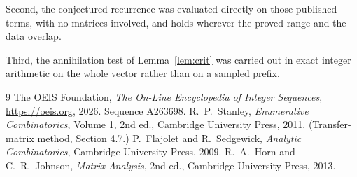 \documentclass[11pt,a4paper]{article}
\theoremstyle{plain}
\theoremstyle{definition}
\begin{document}
Second, the conjectured recurrence was evaluated directly on those published terms, with no
matrices involved, and holds wherever the proved range and the data overlap.

Third, the annihilation test of Lemma~\ref{lem:crit} was carried out in exact integer
arithmetic on the whole vector rather than on a sampled prefix.

\begin{thebibliography}{9}
 The OEIS Foundation, \emph{The On-Line Encyclopedia of Integer
Sequences}, \url{https://oeis.org}, 2026. Sequence A263698.
 R.~P.~Stanley, \emph{Enumerative Combinatorics}, Volume 1, 2nd ed.,
Cambridge University Press, 2011. (Transfer-matrix method, Section 4.7.)
 P.~Flajolet and R.~Sedgewick, \emph{Analytic Combinatorics}, Cambridge
University Press, 2009.
 R.~A.~Horn and C.~R.~Johnson, \emph{Matrix Analysis}, 2nd ed., Cambridge
University Press, 2013.
\end{thebibliography}
\end{document}
